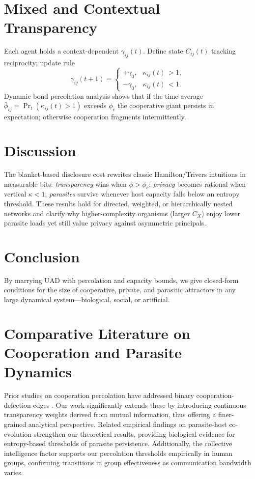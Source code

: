 \documentclass[10pt,conference]{IEEEtran}
\newcommand{\precision}{\gamma}        %
\begin{document}
\section{Mixed and Contextual Transparency}

Each agent holds a context-dependent \(\precision_{ij}(t)\).  
Define state \(C_{ij}(t)\) tracking reciprocity; update rule
\[
\precision_{ij}(t+1)=
\begin{cases}
+\gamma_0,&\kappa_{ij}(t)\,{>}1,\\
-\gamma_0,&\kappa_{ij}(t)\,{<}1.
\end{cases}
\]
Dynamic bond-percolation analysis shows that if the time-average
\(\bar\phi_{ij}=\Pr_t(\kappa_{ij}(t)>1)\) exceeds \(\phi_c\) the cooperative giant persists in expectation; otherwise cooperation fragments intermittently.

\section{Discussion}

The blanket-based disclosure cost rewrites classic Hamilton/Trivers intuitions in measurable bits:
\emph{transparency} wins when \(\phi>\phi_c\); \emph{privacy} becomes rational when vertical \(\kappa<1\); \emph{parasites} survive whenever host capacity falls below an entropy threshold.  
These results hold for directed, weighted, or hierarchically nested networks and clarify why higher-complexity organisms (larger \(C_X\)) enjoy lower parasite loads yet still value privacy against asymmetric principals.

\section{Conclusion}

By marrying UAD with percolation and capacity bounds, we give closed-form conditions for the size of cooperative, private, and parasitic attractors in any large dynamical system—biological, social, or artificial.

\section{Comparative Literature on Cooperation and Parasite Dynamics}
Prior studies on cooperation percolation have addressed binary cooperation-defection edges \cite{yang2018cooperation}. Our work significantly extends these by introducing continuous transparency weights derived from mutual information, thus offering a finer-grained analytical perspective. Related empirical findings on parasite-host co-evolution \cite{bonneaud2022coevolutionary} strengthen our theoretical results, providing biological evidence for entropy-based thresholds of parasite persistence. Additionally, the collective intelligence factor \cite{woolley2010evidence} supports our percolation thresholds empirically in human groups, confirming transitions in group effectiveness as communication bandwidth varies.



\end{document}

